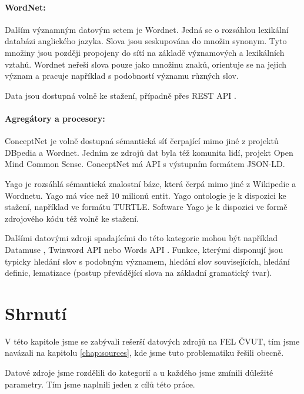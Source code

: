 \paragraph{WordNet:}
Dalším významným datovým setem je Wordnet. Jedná se o rozsáhlou lexikální databázi anglického jazyka. Slova jsou seskupována do množin synonym. Tyto množiny jsou později propojeny do sítí na základě významových a lexikálních vztahů. Wordnet neřeší slova pouze jako množinu znaků, orientuje se na jejich význam a pracuje například s podobností významu různých slov. \cite{princeton-wordnet} \par
\noindent Data jsou dostupná volně ke stažení, případně přes REST API \cite{princeton-wordnet}.
\paragraph{Agregátory a procesory:} \par
ConceptNet je volně dostupná sémantická síť čerpající mimo jiné z projektů DBpedia a Wordnet. Jedním ze zdrojů dat byla též komunita lidí, projekt Open Mind Common Sense. ConceptNet má API s výstupním formátem JSON-LD. \cite{ConceptNet} 
\par
Yago je rozsáhlá sémantická znalostní báze, která čerpá mimo jiné z Wikipedie a Wordnetu. Yago má více než 10 milionů entit. \cite{yago} Yago ontologie je k dispozici ke stažení, například ve formátu TURTLE. Software Yago je k dispozici ve formě zdrojového kódu též volně ke stažení.\cite{yago-web}\par
Dalšími datovými zdroji spadajícími do této kategorie mohou být například Datamuse \cite{datamuse}, Twinword API \cite{twinword} nebo Words API \cite{words-api}. Funkce, kterými disponují jsou typicky hledání slov s podobným významem, hledání slov souvisejících, hledání definic, lematizace (postup převádějící slova na základní gramatický tvar). \par
\section{Shrnutí}
V této kapitole jsme se zabývali rešerší datových zdrojů na FEL ČVUT, tím jsme navázali na kapitolu \ref{chap:sources}, kde jsme tuto problematiku řešili obecně.\par
Datové zdroje jsme rozdělili do kategorií a u každého jsme zmínili důležité parametry. Tím jsme naplnili jeden z cílů této práce.


